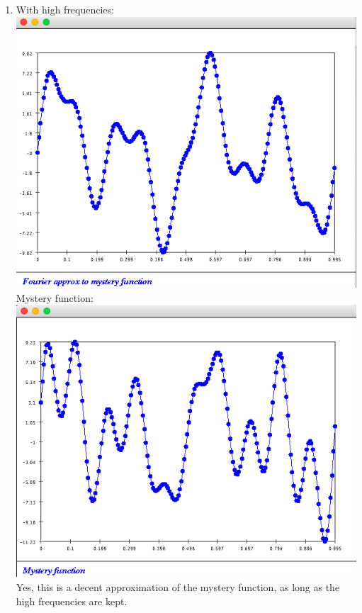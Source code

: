 \documentclass{article}
\begin{document}
\begin{enumerate}
\item With high frequencies:\\
\includegraphics[scale=0.3]{exercise5_high}\\
Mystery function: \\
\includegraphics[scale=0.3]{exercise4}\\
Yes, this is a decent approximation of the mystery function, as long as the high frequencies are kept. 


\end{enumerate}
\end{document}
